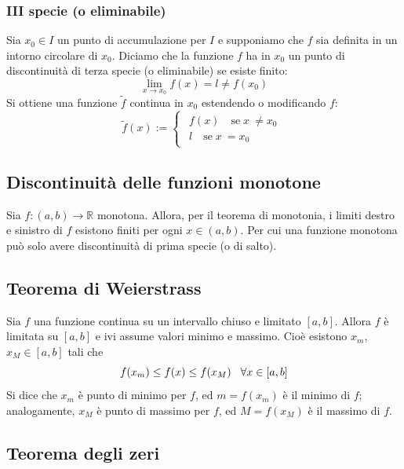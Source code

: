 \documentclass[12pt]{article}
\begin{document}
\subsubsection{III specie (o eliminabile)}
Sia $x_0 \in I$ un punto di accumulazione per $I$
e supponiamo che $f$ sia definita in un intorno
circolare di $x_0$. Diciamo che la funzione $f$ ha
in $x_0$ un punto di discontinuità di terza specie
(o eliminabile) se esiste finito:
\[  \lim_{x \to x_0} f(x) = l \neq f(x_0) \]
Si ottiene una funzione $\tilde{f}$ continua in $x_0$
estendendo o modificando $f$:
\[ \tilde{f}(x) := \begin{cases} \begin{aligned}
f(x)\quad \text{se} \; x\ \neq x_0 \\
l\quad \text{se} \; x\ = x_0
\end{aligned}  \end{cases} \]


\subsection{Discontinuità delle funzioni monotone}
Sia $f: (a, b) \to \mathbb{R}$ monotona. Allora,
per il teorema di monotonia,
i limiti destro e sinistro di $f$
esistono finiti per ogni $x \in (a,b)$.
Per cui una funzione monotona
può solo avere discontinuità
di prima specie (o di salto).

\subsection{Teorema di Weierstrass}
Sia $f$ una funzione continua su un intervallo
chiuso e limitato $[a,b]$. Allora $f$ è limitata
su $[a,b]$ e ivi assume valori minimo e massimo.
Cioè esistono $x_m$,$x_M \in [a,b]$ tali che
\[ f(x_m) \leq f(x) \leq f(x_M) \hspace{0.3cm} \forall x \in [a,b]\]
Si dice che $x_m$ è punto di minimo per $f$,
ed $m = f(x_m)$ è il minimo di $f$;
analogamente, $x_M$ è punto di massimo per $f$,
ed $M = f(x_M)$ è il massimo di $f$.

\subsection{Teorema degli zeri}
\end{document}
